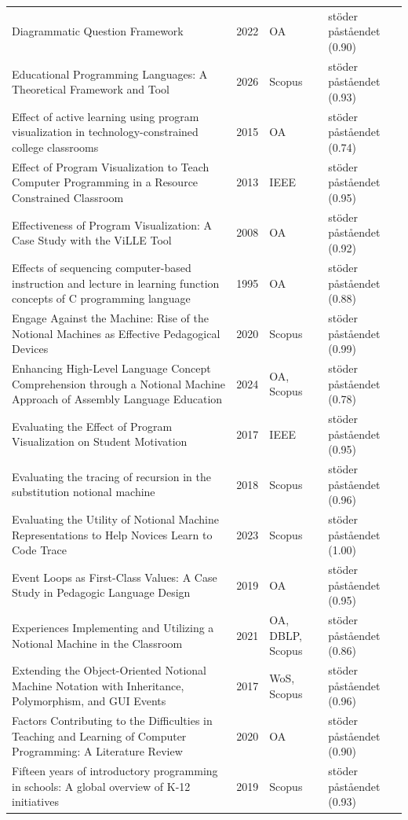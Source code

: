 \begin{longtable}{@{}%
  >{\raggedright\arraybackslash}p{}c%
  >{\raggedright\arraybackslash}p{}%
  >{\raggedright\arraybackslash}p{}@{}}
Diagrammatic Question Framework & 2022 & OA & stöder påståendet (0.90) \\
Educational Programming Languages: A Theoretical Framework and Tool & 2026 & Scopus & stöder påståendet (0.93) \\
Effect of active learning using program visualization in technology-constrained college classrooms & 2015 & OA & stöder påståendet (0.74) \\
Effect of Program Visualization to Teach Computer Programming in a Resource Constrained Classroom & 2013 & IEEE & stöder påståendet (0.95) \\
Effectiveness of Program Visualization: A Case Study with the ViLLE Tool & 2008 & OA & stöder påståendet (0.92) \\
Effects of sequencing computer-based instruction and lecture in learning function concepts of C programming language & 1995 & OA & stöder påståendet (0.88) \\
Engage Against the Machine: Rise of the Notional Machines as Effective Pedagogical Devices & 2020 & Scopus & stöder påståendet (0.99) \\
Enhancing High-Level Language Concept Comprehension through a Notional Machine Approach of Assembly Language Education & 2024 & OA, Scopus & stöder påståendet (0.78) \\
Evaluating the Effect of Program Visualization on Student Motivation & 2017 & IEEE & stöder påståendet (0.95) \\
Evaluating the tracing of recursion in the substitution notional machine & 2018 & Scopus & stöder påståendet (0.96) \\
Evaluating the Utility of Notional Machine Representations to Help Novices Learn to Code Trace & 2023 & Scopus & stöder påståendet (1.00) \\
Event Loops as First-Class Values: A Case Study in Pedagogic Language Design & 2019 & OA & stöder påståendet (0.95) \\
Experiences Implementing and Utilizing a Notional Machine in the Classroom & 2021 & OA, DBLP, Scopus & stöder påståendet (0.86) \\
Extending the Object-Oriented Notional Machine Notation with Inheritance, Polymorphism, and GUI Events & 2017 & WoS, Scopus & stöder påståendet (0.96) \\
Factors Contributing to the Difficulties in Teaching and Learning of Computer Programming: A Literature Review & 2020 & OA & stöder påståendet (0.90) \\
Fifteen years of introductory programming in schools: A global overview of K-12 initiatives & 2019 & Scopus & stöder påståendet (0.93) \\

\end{longtable}
